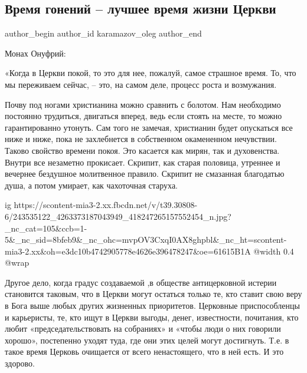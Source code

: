  
 
 
 
 
 
\subsection{Время гонений – лучшее время жизни Церкви}
\label{sec:30_09_2021.fb.karamazov_oleg.1.cerkov_gonenia}
 
\ifcmt
 author_begin
   author_id karamazov_oleg
 author_end
\fi

Монах Онуфрий:

«Когда в Церкви покой, то это для нее, пожалуй, самое страшное время. То, что
мы переживаем сейчас, – это, на самом деле, процесс роста и возмужания.

Почву под ногами христианина можно сравнить с болотом. Нам необходимо постоянно
трудиться, двигаться вперед, ведь если стоять на месте, то можно гарантированно
утонуть. Сам того не замечая, христианин будет опускаться все ниже и ниже, пока
не захлебнется в собственном окамененном нечувствии. Таково свойство времени
покоя. Это касается как мирян, так и духовенства. Внутри все незаметно
прокисает. Скрипит, как старая половица, утреннее и вечернее бездушное
молитвенное правило. Скрипит не смазанная благодатью душа, а потом умирает, как
чахоточная старуха.

\ifcmt
  ig https://scontent-mia3-2.xx.fbcdn.net/v/t39.30808-6/243535122_4263373187043949_418247265157552454_n.jpg?_nc_cat=105&ccb=1-5&_nc_sid=8bfeb9&_nc_ohc=mvpOV3CxqI0AX8ghpbl&_nc_ht=scontent-mia3-2.xx&oh=e3dc10b4742905778e4626e396478247&oe=61615B1A
  @width 0.4
  @wrap 
\fi

Другое дело, когда градус создаваемой ,в обществе антицерковной истерии
становится таковым, что в Церкви могут остаться только те, кто ставит свою веру
в Бога выше любых других жизненных приоритетов. Церковные приспособленцы и
карьеристы, те, кто ищут в Церкви выгоды, денег, известности, почитания, кто
любит «председательствовать на собраниях» и «чтобы люди о них говорили хорошо»,
постепенно уходят туда, где они этих целей могут достигнуть. Т.е. в такое время
Церковь очищается от всего ненастоящего, что в ней есть. И это здорово. 


